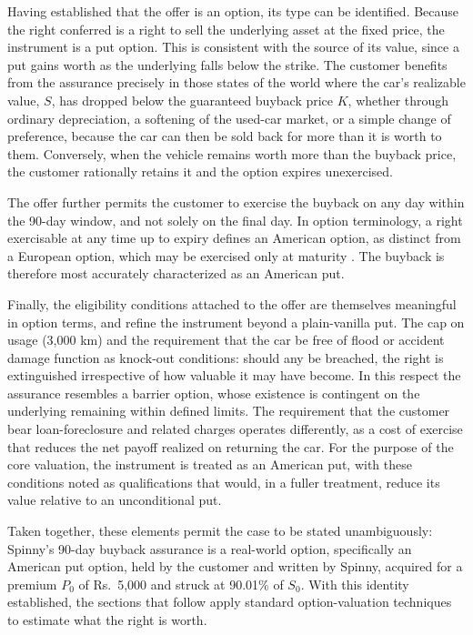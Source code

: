 \documentclass[11pt, a4paper]{article}
\begin{document}
Having established that the offer is an option, its type can be identified. Because the right conferred is a right to sell the underlying asset at the fixed price, the instrument is a put option. This is consistent with the source of its value, since a put gains worth as the underlying falls below the strike. The customer benefits from the assurance precisely in those states of the world where the car's realizable value, $S$, has dropped below the guaranteed buyback price $K$, whether through ordinary depreciation, a softening of the used-car market, or a simple change of preference, because the car can then be sold back for more than it is worth to them. Conversely, when the vehicle remains worth more than the buyback price, the customer rationally retains it and the option expires unexercised.

The offer further permits the customer to exercise the buyback on any day within the 90-day window, and not solely on the final day. In option terminology, a right exercisable at any time up to expiry defines an American option, as distinct from a European option, which may be exercised only at maturity \cite{hull2022}. The buyback is therefore most accurately characterized as an American put. 

Finally, the eligibility conditions attached to the offer are themselves meaningful in option terms, and refine the instrument beyond a plain-vanilla put. The cap on usage (3,000 km) and the requirement that the car be free of flood or accident damage function as knock-out conditions: should any be breached, the right is extinguished irrespective of how valuable it may have become. In this respect the assurance resembles a barrier option, whose existence is contingent on the underlying remaining within defined limits. The requirement that the customer bear loan-foreclosure and related charges operates differently, as a cost of exercise that reduces the net payoff realized on returning the car. For the purpose of the core valuation, the instrument is treated as an American put, with these conditions noted as qualifications that would, in a fuller treatment, reduce its value relative to an unconditional put.

Taken together, these elements permit the case to be stated unambiguously: Spinny's 90-day buyback assurance is a real-world option, specifically an American put option, held by the customer and written by Spinny, acquired for a premium $P_0$ of Rs.~5,000 and struck at 90.01\% of $S_0$. With this identity established, the sections that follow apply standard option-valuation techniques to estimate what the right is worth.
\end{document}
